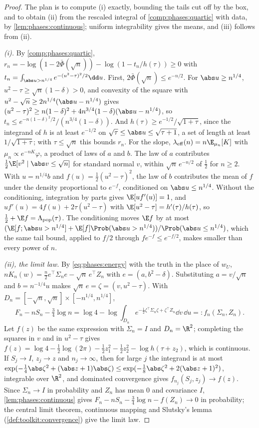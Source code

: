 \begin{refsection}
\begin{proof}
The plan is to compute (i) exactly, bounding the tails cut off by the box, and to obtain (ii) from the rescaled integral of \cref{comp:phases:quartic} with data, by \cref{lem:phases:continuous}; uniform integrability gives the means, and (iii) follows from (ii).

\emph{(i).} By \cref{comp:phases:quartic}, $r_n=-\log(1-2\bar\Phi(\sqrt n))-\log(1-t_n/h(\tau))\ge0$ with $t_n=\int_{\abs u>n^{1/4}}e^{-(u^2-\tau)^2/2}\dd u$. First, $2\bar\Phi(\sqrt n)\le e^{-n/2}$. For $\abs u\ge n^{1/4}$, $u^2-\tau\ge\sqrt n(1-\delta)>0$, and convexity of the square with $u^2-\sqrt n\ge2n^{1/4}(\abs u-n^{1/4})$ gives $(u^2-\tau)^2\ge n(1-\delta)^2+4n^{3/4}(1-\delta)(\abs u-n^{1/4})$, so $t_n\le e^{-n(1-\delta)^2/2}/(n^{3/4}(1-\delta))$. And $h(\tau)\ge e^{-1/2}/\sqrt{1+\tau}$, since the integrand of $h$ is at least $e^{-1/2}$ on $\sqrt\tau\le\abs u\le\sqrt{\tau+1}$, a set of length at least $1/\sqrt{1+\tau}$; with $\tau\le\sqrt n$ this bounds $r_n$. For the slope, $\lambda_{\mathrm{eff}}(n)=n\E_{\mu_n}[K]$ with $\mu_n\propto e^{-nK}\varphi$, a product of laws of $a$ and $b$. The law of $a$ contributes $\frac12\E[v^2\mid\abs v\le\sqrt n]$ for standard normal $v$, within $\sqrt n\,e^{-n/2}$ of $\frac12$ for $n\ge2$. With $u=n^{1/4}b$ and $f(u)=\frac12(u^2-\tau)^2$, the law of $b$ contributes the mean of $f$ under the density proportional to $e^{-f}$, conditioned on $\abs u\le n^{1/4}$. Without the conditioning, integration by parts gives $\E[uf'(u)]=1$, and $uf'(u)=4f(u)+2\tau(u^2-\tau)$ with $\E[u^2-\tau]=h'(\tau)/h(\tau)$, so $\frac12+\E f=\phasesLpop(\tau)$. The conditioning moves $\E f$ by at most $(\E[f;\abs u>n^{1/4}]+\E[f]\Prob(\abs u>n^{1/4}))/\Prob(\abs u\le n^{1/4})$, which the same tail bound, applied to $f/2$ through $fe^{-f}\le e^{-f/2}$, makes smaller than every power of $n$.

\emph{(ii), the limit law.} By \eqref{eq:phases:energy} with the truth in the place of $w_U$, $nK_n(w)=\frac n2e^\top\Sigma_ne-\sqrt n\,e^\top Z_n$ with $e=(a,b^2-\delta)$. Substituting $a=v/\sqrt n$ and $b=n^{-1/4}u$ makes $\sqrt n\,e=\zeta=(v,u^2-\tau)$. With $D_n=[-\sqrt n,\sqrt n]\times[-n^{1/4},n^{1/4}]$,
\[
F_n-nS_n-\tfrac34\log n=\log4-\log\int_{D_n}e^{-\frac12\zeta^\top\Sigma_n\zeta+\zeta^\top Z_n}\dd v\,\dd u=:f_n(\Sigma_n,Z_n).
\]
Let $f(z)$ be the same expression with $\Sigma_n=I$ and $D_n=\R^2$; completing the squares in $v$ and in $u^2-\tau$ gives $f(z)=\log4-\frac12\log(2\pi)-\frac12z_1^2-\frac12z_2^2-\log h(\tau+z_2)$, which is continuous. If $S_j\to I$, $z_j\to z$ and $n_j\to\infty$, then for large $j$ the integrand is at most $\exp(-\frac14\abs\zeta^2+(\abs z+1)\abs\zeta)\le\exp(-\frac18\abs\zeta^2+2(\abs z+1)^2)$, integrable over $\R^2$, and dominated convergence gives $f_{n_j}(S_j,z_j)\to f(z)$. Since $\Sigma_n\to I$ in probability and $Z_n$ has mean $0$ and covariance $I$, \cref{lem:phases:continuous} gives $F_n-nS_n-\frac34\log n-f(Z_n)\to0$ in probability; the central limit theorem, continuous mapping and Slutsky's lemma (\cref{def:toolkit:convergence}) give the limit law.


\end{proof}
\end{refsection}
